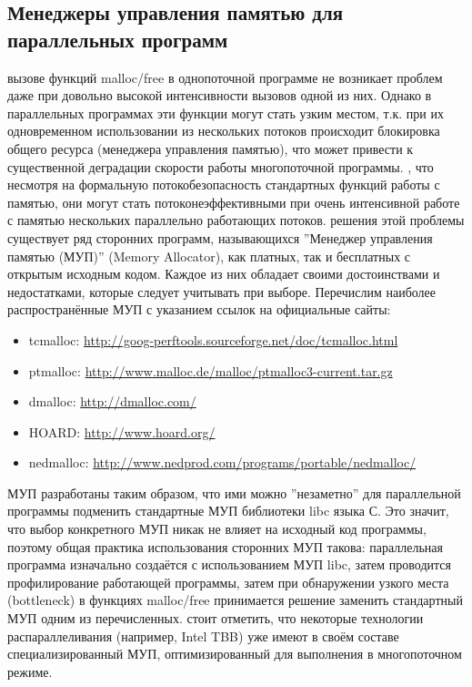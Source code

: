 { %
	\subsection{Менеджеры управления памятью для параллельных программ}
	 вызове функций malloc/free в однопоточной программе не возникает проблем даже при довольно высокой интенсивности вызовов одной из них. Однако в параллельных программах эти функции могут стать узким местом, т.к. при их одновременном использовании из нескольких потоков происходит блокировка общего ресурса (менеджера управления памятью), что может привести к существенной деградации скорости работы многопоточной программы.
	, что несмотря на формальную потокобезопасность стандартных функций работы с памятью, они могут стать потоконеэффективными при очень интенсивной работе с памятью нескольких параллельно работающих потоков.
	 решения этой проблемы существует ряд сторонних программ, называющихся ''Менеджер управления памятью (МУП)'' (Memory Allocator), как платных, так и бесплатных с открытым исходным кодом. Каждое из них обладает своими достоинствами и недостатками, которые следует учитывать при выборе. Перечислим наиболее распространённые МУП с указанием ссылок на официальные сайты:
	\begin{itemize}
		\sloppy
		\item tcmalloc: \url{http://goog-perftools.sourceforge.net/doc/tcmalloc.html}
		\item ptmalloc: \url{http://www.malloc.de/malloc/ptmalloc3-current.tar.gz}
		\item dmalloc: \url{http://dmalloc.com/}
		\item HOARD: \url{http://www.hoard.org/}
		\item nedmalloc: \url{http://www.nedprod.com/programs/portable/nedmalloc/}
	\end{itemize}
	 МУП разработаны таким образом, что ими можно ''незаметно'' для параллельной программы подменить стандартные МУП библиотеки libc языка С. Это значит, что выбор конкретного МУП никак не влияет на исходный код программы, поэтому общая практика использования сторонних МУП такова: параллельная программа изначально создаётся с использованием МУП libc, затем проводится профилирование работающей программы, затем при обнаружении узкого места (bottleneck) в функциях malloc/free принимается решение заменить стандартный МУП одним из перечисленных.
	 стоит отметить, что некоторые технологии распараллеливания (например, Intel TBB) уже имеют в своём составе специализированный МУП, оптимизированный для выполнения в многопоточном режиме.
	\par
}